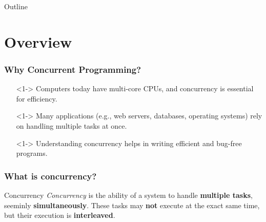 \documentclass[xcolor={dvipsnames,svgnames},aspectratio=169]{beamer}
\begin{document}
\begin{frame}{Outline}
  \tableofcontents
\end{frame}

\section{Overview}

\begin{frame}[fragile]
  \frametitle{Why Concurrent Programming?}

  \begin{itemize}
  \item[\faBook]<1-> Computers today have multi-core CPUs, and concurrency is essential for efficiency.
  \item[\faBook]<1-> Many applications (e.g., web servers, databases, operating systems) rely on handling multiple tasks at once.
  \item[\faBook]<1-> Understanding concurrency helps in writing efficient and
    bug-free programs.
  \end{itemize}
  \vspace{0.6cm}
\end{frame}

\begin{frame}[fragile]
  \frametitle{What is concurrency?}

  \begin{block}{Concurrency}
    \emph{Concurrency} is the ability of a system to handle \textbf{multiple
      tasks}, seeminly \textbf{simultaneously}. These tasks may \textbf{not} execute at the
    exact same time, but their execution is \textbf{interleaved}.
  \end{block}

\end{frame}
\end{document}
